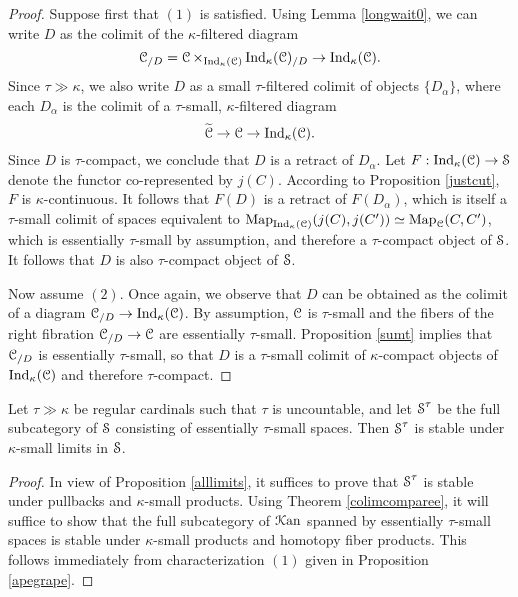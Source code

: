 \begin{proof}
Suppose first that $(1)$ is satisfied. Using Lemma \ref{longwait0}, we can write $D$
as the colimit of the $\kappa$-filtered diagram
$$ \operatorname{\mathcal{C}}_{/D} = \operatorname{\mathcal{C}} \times_{ \operatorname{Ind}_{\kappa}(\operatorname{\mathcal{C}})} \operatorname{Ind}_{\kappa}(\operatorname{\mathcal{C}})_{/D} \rightarrow \operatorname{Ind}_{\kappa}(\operatorname{\mathcal{C}}).$$
Since $\tau \gg \kappa$, we also write $D$ as a small $\tau$-filtered colimit of objects
$\{ D_{\alpha} \}$, where each $D_{\alpha}$ is the colimit of a $\tau$-small, $\kappa$-filtered
diagram $$ \widetilde{\operatorname{\mathcal{C}}} \rightarrow \operatorname{\mathcal{C}} \rightarrow \operatorname{Ind}_{\kappa}(\operatorname{\mathcal{C}}).$$
Since $D$ is $\tau$-compact, we conclude that $D$ is a retract of $D_{\alpha}$. Let
$F: \operatorname{Ind}_{\kappa}(\operatorname{\mathcal{C}}) \rightarrow \operatorname{\mathcal{S}}$ denote the functor co-represented by $j(C)$.
According to Proposition \ref{justcut}, $F$ is $\kappa$-continuous. It follows that
$F(D)$ is a retract of $F(D_{\alpha})$, which is itself a $\tau$-small colimit of spaces equivalent
to $\operatorname{{Map}}_{\operatorname{Ind}_{\kappa}(\operatorname{\mathcal{C}})}(j(C), j(C')) \simeq \operatorname{{Map}}_{\operatorname{\mathcal{C}}}(C,C')$, which is essentially $\tau$-small by assumption, and therefore a $\tau$-compact object of $\operatorname{\mathcal{S}}$. It follows that $D$ is also $\tau$-compact object of $\operatorname{\mathcal{S}}$. 

Now assume $(2)$. Once again, we observe that $D$ can be obtained as the colimit of a diagram
$\operatorname{\mathcal{C}}_{/D} \rightarrow \operatorname{Ind}_{\kappa}(\operatorname{\mathcal{C}})$. By assumption, $\operatorname{\mathcal{C}}$ is $\tau$-small and the fibers of the right fibration $\operatorname{\mathcal{C}}_{/D} \rightarrow \operatorname{\mathcal{C}}$ are essentially $\tau$-small. Proposition \ref{sumt} implies that $\operatorname{\mathcal{C}}_{/D}$ is essentially $\tau$-small, so that $D$ is a
$\tau$-small colimit of $\kappa$-compact objects of $\operatorname{Ind}_{\kappa}(\operatorname{\mathcal{C}})$ and therefore $\tau$-compact.
\end{proof}

\begin{lemma}\label{paleman}
Let $\tau \gg \kappa$ be regular cardinals such that $\tau$ is uncountable, and let
$\operatorname{\mathcal{S}}^{\tau}$ be the full subcategory of $\operatorname{\mathcal{S}}$ consisting of essentially $\tau$-small spaces.
Then $\operatorname{\mathcal{S}}^{\tau}$ is stable under $\kappa$-small limits in $\operatorname{\mathcal{S}}$.
\end{lemma}

\begin{proof}
In view of Proposition \ref{alllimits}, it suffices to prove that $\operatorname{\mathcal{S}}^{\tau}$ is stable under pullbacks and $\kappa$-small products. Using Theorem \ref{colimcomparee}, it will suffice to show that the full subcategory of $\operatorname{\mathcal{K}an}$ spanned by essentially $\tau$-small spaces is stable under $\kappa$-small products and homotopy fiber products. This follows immediately from characterization $(1)$ given in Proposition \ref{apegrape}.
\end{proof}

